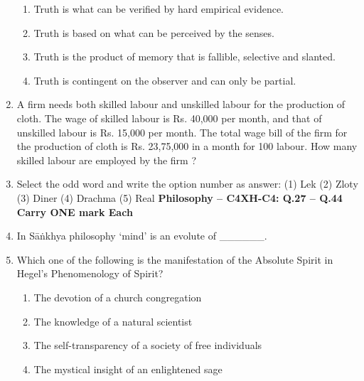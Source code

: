 \documentclass[12pt]{article}
\theoremstyle{remark}
\begin{document}
\begin{enumerate}
\begin{enumerate}
    \item Truth is what can be verified by hard empirical evidence.
    \item Truth is based on what can be perceived by the senses.
    \item Truth is the product of memory that is fallible, selective and slanted.
    \item Truth is contingent on the observer and can only be partial.
\end{enumerate}
\hfill{}
\item A firm needs both skilled labour and unskilled labour for the production of cloth. The wage of skilled labour is Rs. 40,000 per month, and that of unskilled labour is Rs. 15,000 per month. The total wage bill of the firm for the production of cloth is Rs. 23,75,000 in a month for 100 labour. How many skilled labour are employed by the firm ?
\hfill{}
\item Select the odd word and write the option number as answer: (1) Lek (2) Zloty (3) Diner (4) Drachma (5) Real
\hfill{}
\newpage
\textbf{Philosophy – C4\newline XH-C4: Q.27 – Q.44 Carry ONE mark Each}
\item In S\={a}\.{n}khya philosophy ‘mind’  is an evolute of \_\_\_\_\_\_.
\begin{enumerate}
\end{enumerate}
\hfill{}
\item Which one of the following is the manifestation of the Absolute Spirit in Hegel’s Phenomenology of Spirit?
\begin{enumerate}
    \item The devotion of a church congregation
    \item The knowledge of a natural scientist
    \item The self-transparency of a society of free individuals
    \item The mystical insight of an enlightened sage

\end{enumerate}
\end{enumerate}
\end{document}
